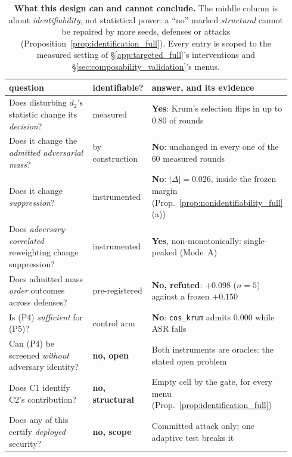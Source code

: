 \documentclass{article}
\begin{document}
\begin{table}[h]
\caption{\textbf{What this design can and cannot conclude.} The middle column is about
\emph{identifiability}, not statistical power: a ``no'' marked \emph{structural} cannot be repaired by
more seeds, defenses or attacks (Proposition~\ref{prop:identification_full}). Every entry is scoped to the
measured setting of §\ref{app:targeted_full}'s interventions and §\ref{sec:composability_validation}'s
menus.}
\label{tab:can_cannot}
\centering\small\setlength{\tabcolsep}{4pt}
\begin{tabular}{@{}p{0.40\linewidth}p{0.16\linewidth}p{0.38\linewidth}@{}}
\toprule
\textbf{question} & \textbf{identifiable?} & \textbf{answer, and its evidence} \\
\midrule
Does disturbing $d_2$'s statistic change its \emph{decision}? & measured & \textbf{Yes}: Krum's selection flips in up to $0.80$ of rounds \\
Does it change the \emph{admitted adversarial mass}? & by construction & \textbf{No}: unchanged in every one of the $60$ measured rounds \\
Does it change \emph{suppression}? & instrumented & \textbf{No}: $|\Delta|{=}0.026$, inside the frozen margin (Prop.~\ref{prop:nonidentifiability_full}(a)) \\
Does \emph{adversary-correlated} reweighting change suppression? & instrumented & \textbf{Yes}, non-monotonically: single-peaked (Mode~A) \\
Does admitted mass \emph{order} outcomes across defenses? & pre-registered & \textbf{No, refuted}: $+0.098$ ($n{=}5$) against a frozen ${+}0.150$ \\
Is (P4) \emph{sufficient} for (P5)? & control arm & \textbf{No}: \texttt{cos\_krum} admits $0.000$ while ASR falls \\
Can (P4) be screened \emph{without} adversary identity? & \textbf{no, open} & Both instruments are oracles: the stated open problem \\
Does C1 identify C2's contribution? & \textbf{no, structural} & Empty cell by the gate, for every menu (Prop.~\ref{prop:identification_full}) \\
Does any of this certify \emph{deployed} security? & \textbf{no, scope} & Committed attack only; one adaptive test breaks it \\
\bottomrule
\end{tabular}
\end{table}
\end{document}
